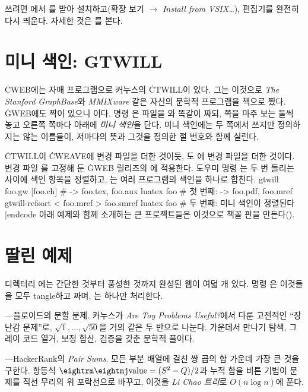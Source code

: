쓰려면 에서
를 받아 설치하고(확장 보기 $\to$ {\it Install from VSIX\dots\/}),
편집기를 완전히 다시 띄운다. 자세한 것은 를 본다.

\chapter{미니 색인: GTWILL}
\noindent \.{CWEB}에는 자매 프로그램으로 커누스의 \.{CTWILL}이 있다. 그는 이것으로
{\it The Stanford GraphBase\/}와 {\it MMIXware\/} 같은 자신의 문학적 프로그램을
책으로 짰다. \.{GWEB}에도 짝이 있으니
이다. 명령 은
 파일을 와 똑같이 짜되, 쪽을 마주 보는 둘씩 놓고 오른쪽
쪽마다 아래에 {\it 미니 색인\/}을 단다. 미니 색인에는 두 쪽에서 쓰지만 정의하지는
않는 이름들이, 저마다의 뜻과 그것을 정의한 절 번호와 함께 실린다.

\.{CTWILL}이 \.{CWEAVE}에 변경 파일을 더한 것이듯, 도 에
변경 파일을 더한 것이다. 변경 파일 를 고정해 둔 \.{GWEB} 릴리즈의
에 적용한다. 도우미 명령 는 
두 번 돌리는 사이에 색인 항목을 정렬하고, 는 여러 프로그램의
색인을 하나로 합친다.
\begincode
gtwill foo.gw [foo.ch]          # -> foo.tex, foo.aux
luatex foo                      # 첫 번째: -> foo.pdf, foo.mref
gtwill-refsort < foo.mref > foo.smref
luatex foo                      # 두 번째: 미니 색인이 정렬된다
|endcode
아래 예제와 함께 소개하는 큰 프로젝트들은 이것으로 책꼴 판을 만든다().

\chapter{딸린 예제}
디렉터리 에는 간단한 것부터 풍성한 것까지 완성된 웹이 여덟 개
있다. 명령 은 이것들을 모두 tangle하고 짜며, 는 하나만 처리한다.

\bull {}---플로이드의 분할 문제. 커누스가 {\it Are Toy Problems
Useful?}에서 다룬 고전적인 ``장난감 문제''로, $\sqrt1,\ldots,\sqrt{50}$을 거의
같은 두 반으로 나눈다. 가운데서 만나기 탐색, 그레이 코드 열거, 보정 합산,
 검증을 갖춘 문학적 풀이다.

\bull {}---HackerRank의 {\it Pair Sums\/}. 모든 부분 배열에 걸친
쌍 곱의 합 가운데 가장 큰 것을 구한다. 항등식 ${\rm value} = (S^2-Q)/2$과
누적 합을 비튼 기법이 문제를 직선 무리의 위 포락선으로 바꾸고, 이것을
{\sl Li Chao 트리\/}로 $O(n\log n)$에 푼다.

